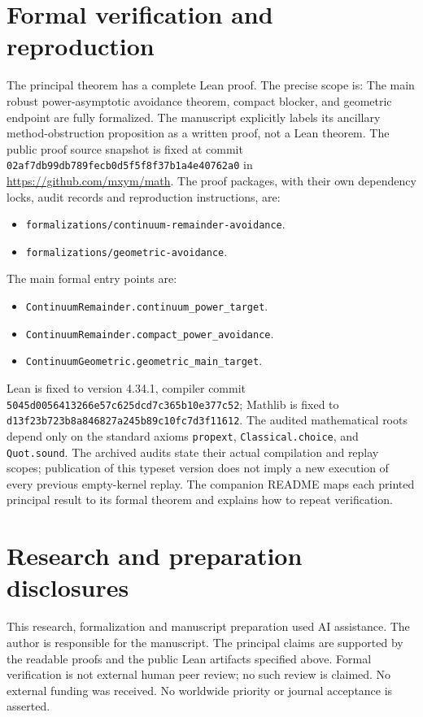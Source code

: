 \documentclass[11pt]{article}
\theoremstyle{definition}
\theoremstyle{remark}
\begin{document}
\section{Formal verification and reproduction}
The principal theorem has a complete Lean proof. The precise scope is:
The main robust power-asymptotic avoidance theorem, compact blocker, and geometric endpoint are fully formalized. The manuscript explicitly labels its ancillary method-obstruction proposition as a written proof, not a Lean theorem.
The public proof source snapshot is fixed at commit
\nolinkurl{02af7db99db789fecb0d5f5f8f37b1a4e40762a0} in \url{https://github.com/mxym/math}.
The proof packages, with their own dependency locks, audit records and
reproduction instructions, are:
\begin{itemize}
\item \nolinkurl{formalizations/continuum-remainder-avoidance}.
\item \nolinkurl{formalizations/geometric-avoidance}.
\end{itemize}
The main formal entry points are:
\begin{itemize}
\item \nolinkurl{ContinuumRemainder.continuum_power_target}.
\item \nolinkurl{ContinuumRemainder.compact_power_avoidance}.
\item \nolinkurl{ContinuumGeometric.geometric_main_target}.
\end{itemize}
Lean is fixed to version 4.34.1, compiler commit
\nolinkurl{5045d0056413266e57c625dcd7c365b10e377c52}; Mathlib is fixed to
\nolinkurl{d13f23b723b8a846827a245b89c10fc7d3f11612}.
The audited mathematical roots depend only on the standard axioms
\texttt{propext}, \texttt{Classical.choice}, and \texttt{Quot.sound}.
The archived audits state their actual compilation and replay scopes;
publication of this typeset version does not imply a new execution of every
previous empty-kernel replay. The companion README maps each printed
principal result to its formal theorem and explains how to repeat verification.

\section*{Research and preparation disclosures}
This research, formalization and manuscript preparation used AI assistance.
The author is responsible for the manuscript. The principal claims are
supported by the readable proofs and the public Lean artifacts specified
above. Formal verification is not external human peer review; no such review
is claimed. No external funding was received. No worldwide priority or
journal acceptance is asserted.
\end{document}
